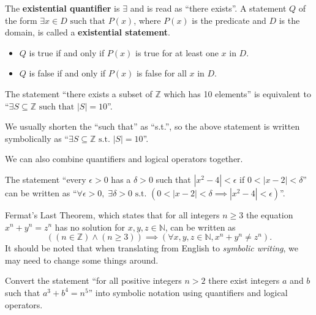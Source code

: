 \begin{definition}
    The \textbf{existential quantifier} is $\exists$ and is read as ``there exists''. A statement $Q$ of the form $\exists x \in D \textrm{ such that } P(x)$, where $P(x)$ is the predicate and $D$ is the domain, is called a \textbf{existential statement}.
    \begin{itemize}
        \item $Q$ is true if and only if $P(x)$ is true for at least one $x$ in $D$.
        \item $Q$ is false if and only if $P(x)$ is false for all $x$ in $D$.
    \end{itemize}
\end{definition}
\begin{example}
    The statement ``there exists a subset of $\mathbb{Z}$ which has 10 elements'' is equivalent to ``$\exists S \subseteq \mathbb{Z} \text{ such that } |S| = 10$''.
\end{example}
\begin{remark}
    We usually shorten the ``such that'' as ``s.t.'', so the above statement is written symbolically as ``$\exists S \subseteq \mathbb{Z} \text{ s.t. } |S| = 10$''.
\end{remark}

\newpage

We can also combine quantifiers and logical operators together.
\begin{example}
    The statement ``every $\epsilon > 0$ has a $\delta > 0$ such that $|x^2 - 4| < \epsilon$ if $0 < |x - 2| < \delta$'' can be written as ``$\forall \epsilon > 0,\;\exists \delta > 0 \text{ s.t. } (0 < |x - 2| < \delta \implies |x^2 - 4| < \epsilon)$''.
\end{example}
\begin{example}
    Fermat's Last Theorem, which states that for all integers $n\geq 3$ the equation $x^n + y^n = z^n$ has no solution for $x, y, z \in \mathbb{N}$, can be written as
    \[
        \left((n \in \mathbb{Z}) \land (n \geq 3)\right) \implies \left(\forall x, y, z \in \mathbb{N}, x^n + y^n \neq z^n\right).
    \]
    It should be noted that when translating from English to \textit{symbolic writing}, we may need to change some things around.
\end{example}

\begin{exercise}
    Convert the statement ``for all positive integers $n > 2$ there exist integers $a$ and $b$ such that $a^3 + b^4 = n^5$'' into symbolic notation using quantifiers and logical operators.
\end{exercise}

